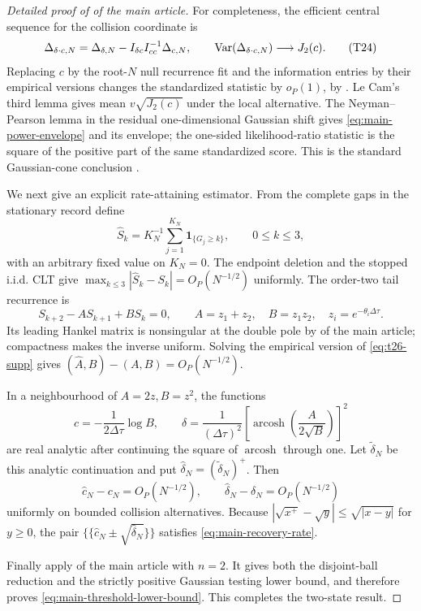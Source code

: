 \begin{proof}[Detailed proof of  of the main article]
For completeness, the efficient central sequence for the collision
coordinate is
\[
 \Delta_{\delta\cdot c,N}
 =\Delta_{\delta,N}-I_{\delta c}I_{cc}^{-1}\Delta_{c,N},
 \qquad \operatorname{Var}(\Delta_{\delta\cdot c,N})\longrightarrow J_2(c).
\tag{T24}\label{eq:t24-supp}
\]
Replacing \(c\) by the root-\(N\) null recurrence fit and the information
entries by their empirical versions changes the standardized statistic by
\(o_P(1)\), by .  Le Cam's third lemma
gives mean \(v\sqrt{J_2(c)}\) under the local alternative.  The
Neyman--Pearson lemma in the residual one-dimensional Gaussian shift gives
\eqref{eq:main-power-envelope} and its envelope; the one-sided likelihood-ratio statistic is
the square of the positive part of the same standardized score.  This is the
standard Gaussian-cone conclusion
\cite{Chernoff1954LikelihoodRatio,SelfLiang1987NonstandardLRT,
vanDerVaart1998AsymptoticStatistics}.

We next give an explicit rate-attaining estimator.  From the complete gaps in
the stationary record define
\[
 \widehat S_k=K_N^{-1}\sum_{j=1}^{K_N}\mathbf1_{\{G_j\ge k\}},
 \qquad 0\le k\le3,
\tag{T25}\label{eq:t25-supp}
\]
with an arbitrary fixed value on \(K_N=0\).  The endpoint deletion and the
stopped i.i.d. CLT give
\(\max_{k\le3}|\widehat S_k-S_k|=O_P(N^{-1/2})\) uniformly.  The order-two
tail recurrence is
\[
 S_{k+2}-A S_{k+1}+B S_k=0,\qquad
 A=z_1+z_2,\quad B=z_1z_2,\quad z_i=e^{-\theta_i\Delta\tau}.
\tag{T26}\label{eq:t26-supp}
\]
Its leading Hankel matrix is nonsingular at the double pole by
 of the main article; compactness makes
the inverse uniform.  Solving the empirical version of \eqref{eq:t26-supp} gives
\((\widehat A,\widehat B)-(A,B)=O_P(N^{-1/2})\).

In a neighbourhood of \(A=2z,B=z^2\), the functions
\[
 c=-\frac1{2\Delta\tau}\log B,\qquad
 \delta=\frac1{(\Delta\tau)^2}
 \left[\operatorname{arcosh}\left(\frac{A}{2\sqrt B}\right)\right]^2
\tag{T27}\label{eq:t27-supp}
\]
are real analytic after continuing the square of \(\operatorname{arcosh}\)
through one.  Let \(\widetilde\delta_N\) be this analytic continuation and
put \(\widehat\delta_N=(\widetilde\delta_N)^+\).  Then
\[
 \widehat c_N-c_N=O_P(N^{-1/2}),\qquad
 \widehat\delta_N-\delta_N=O_P(N^{-1/2})
\tag{T28}\label{eq:t28-supp}
\]
uniformly on bounded collision alternatives.  Because
\(|\sqrt{x^+}-\sqrt{y}|\le\sqrt{|x-y|}\) for \(y\ge0\), the pair
\(\{\!\{\widehat c_N\pm\sqrt{\widehat\delta_N}\}\!\}\) satisfies
\eqref{eq:main-recovery-rate}.

Finally apply  of the main article with \(n=2\).  It gives
both the disjoint-ball reduction and the strictly positive Gaussian testing
lower bound, and therefore proves \eqref{eq:main-threshold-lower-bound}.  This completes the
two-state result.
\end{proof}
